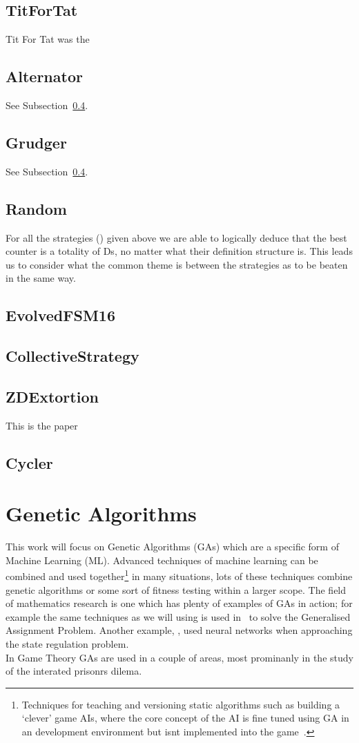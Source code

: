 \subsection{TitForTat}\label{subsec:titfortat}
Tit For Tat was the
\subsection{Alternator}\label{subsec:alternator}
See Subsection~\ref{subsec:random}.
\subsection{Grudger}\label{subsec:grudger}
See Subsection~\ref{subsec:random}.
\subsection{Random}\label{subsec:random}

For all the strategies () given above we are able to logically deduce that the best counter is a totality of Ds, no matter what their definition structure is.
This leads us to consider what the common theme is between the strategies as to be beaten in the same way.



\subsection{EvolvedFSM16}\label{subsec:evolvedFSM16}
\subsection{CollectiveStrategy}\label{subsec:collectiveStrategy}
\subsection{ZDExtortion}\label{subsec:zdExtortion}
This is the paper~\cite{press2012iterated}
\subsection{Cycler}\label{subsec:cycler}

\section{Genetic Algorithms}
This work will focus on Genetic Algorithms (GAs) which are a specific form of Machine Learning (ML).
Advanced techniques of machine learning can be combined and used together\footnote{Techniques for teaching and versioning static algorithms such as building a `clever' game AIs, where the core concept of the AI is fine tuned using GA in an development environment but isnt implemented into the game~\cite{bakkes2009rapid}.} in many situations, lots of these techniques combine genetic algorithms or some sort of fitness testing within a larger scope.
The field of mathematics research is one which has plenty of examples of GAs in action;
for example the same techniques as we will using is used in~\cite{chu1997genetic} to solve the Generalised Assignment Problem.
Another example, \cite{bhanu1995adaptive}, used neural networks when approaching the state regulation problem. \\

In Game Theory GAs are used in a couple of areas, most prominanly in the study of the interated prisonrs dilema.